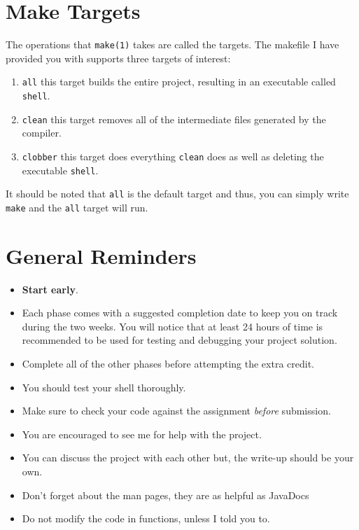 \documentclass [12pt, letterpaper] {article}
\begin{document}
\section*{Make Targets}
The operations that \texttt{make(1)} takes are called the targets. The makefile
I have provided you with supports three targets of interest:
\begin{enumerate}
  \item {\tt all} this target builds the entire project, resulting in an executable
  called {\tt shell}.
  \item {\tt clean} this target removes all of the intermediate files generated by the
  compiler.
  \item {\tt clobber} this target does everything {\tt clean} does as well as
  deleting the executable {\tt shell}.
\end{enumerate}
It should be noted that {\tt all} is the default target and thus, you can simply
write {\tt make} and the {\tt all} target will run.

\section*{General Reminders}
\begin{itemize}
\item \textbf{Start early}.

\item Each phase comes with a suggested completion date to keep you on track
during the two weeks. You will notice that at least 24 hours of time is recommended to
be used for testing and debugging your project solution.

\item Complete all of the other phases before attempting the extra credit.

\item You should test your shell thoroughly.

\item Make sure to check your code against the assignment \emph{before} submission.

\item You are encouraged to see me for help with the project.

\item You can discuss the project with each other but, the write-up should
be your own.

\item Don't forget about the man pages, they are as helpful as JavaDocs

\item Do not modify the code in functions, unless I told you to.
\end{itemize}
\end{document}
